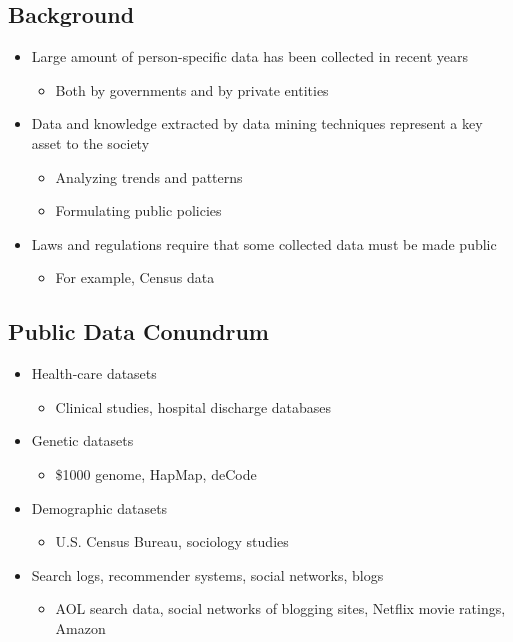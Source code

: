 \documentclass[11pt]{article}
\theoremstyle{definition}
\begin{document}
\subsection{Background}
\begin{itemize}
    \item Large amount of person-specific data has been
    collected in recent years
    \begin{itemize}
        \item Both by governments and by private entities
    \end{itemize}
    \item Data and knowledge extracted by data mining
    techniques represent a key asset to the society
    \begin{itemize}
        \item Analyzing trends and patterns
        \item Formulating public policies
    \end{itemize}
    \item Laws and regulations require that some collected
    data must be made public
    \begin{itemize}
        \item For example, Census data
    \end{itemize}
\end{itemize}

\subsection{Public Data Conundrum}
\begin{itemize}
    \item Health-care datasets
    \begin{itemize}
        \item Clinical studies, hospital discharge databases
    \end{itemize}
    \item Genetic datasets
    \begin{itemize}
        \item \$1000 genome, HapMap, deCode
    \end{itemize}
    \item Demographic datasets
    \begin{itemize}
        \item U.S. Census Bureau, sociology studies
    \end{itemize}
    \item Search logs, recommender systems, social networks, blogs
    \begin{itemize}
        \item AOL search data, social networks of blogging sites, Netflix movie ratings, Amazon
    \end{itemize}
\end{itemize}
\end{document}
